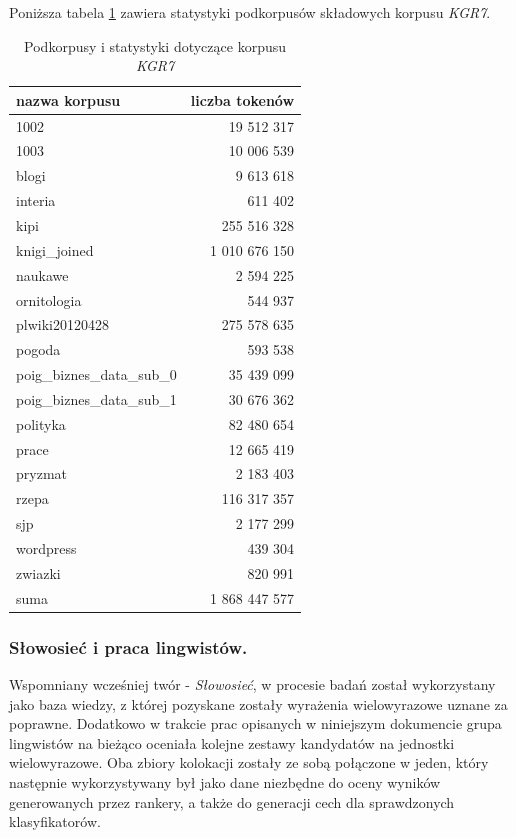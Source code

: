\documentclass[11pt,a4paper]{llncs}
\begin{document}
Poniższa tabela \ref{kgr7_stats} zawiera statystyki podkorpusów składowych korpusu \emph{KGR7}.
\begin{table}[h!]
\centering
\begin{tabular}{l | r}
	\toprule
	nazwa korpusu & liczba tokenów \\
	\midrule
	1002 & 19 512 317 \\
	1003 & 10 006 539 \\
	blogi & 9 613 618 \\
	interia & 611 402 \\
	kipi & 255 516 328 \\
	knigi\_joined & 1 010 676 150 \\
	naukawe & 2 594 225 \\
	ornitologia & 544 937 \\
	plwiki20120428 & 275 578 635 \\
	pogoda & 593 538 \\
	poig\_biznes\_data\_sub\_0 & 35 439 099 \\
	poig\_biznes\_data\_sub\_1 & 30 676 362 \\
	polityka & 82 480 654 \\
	prace & 12 665 419 \\
	pryzmat & 2 183 403 \\
	rzepa & 116 317 357 \\
	sjp & 2 177 299 \\
	wordpress & 439 304 \\
	zwiazki & 820 991 \\
	\hline
	suma & 1 868 447 577 \\
	\bottomrule
\end{tabular}
\caption[Podkorpusy i statystyki korpusu \emph{KGR7}]{Podkorpusy i statystyki dotyczące korpusu \emph{KGR7}}
\label{kgr7_stats}
\end{table}


\subsubsection{Słowosieć i praca lingwistów.}

Wspomniany wcześniej twór - \emph{Słowosieć}, w procesie badań został wykorzystany jako baza wiedzy, z której pozyskane zostały wyrażenia wielowyrazowe uznane za poprawne.
Dodatkowo w trakcie prac opisanych w niniejszym dokumencie grupa lingwistów na bieżąco oceniała kolejne zestawy kandydatów na jednostki wielowyrazowe.
Oba zbiory kolokacji zostały ze sobą połączone w jeden, który następnie wykorzystywany był jako dane niezbędne do oceny wyników generowanych przez rankery, a także do generacji cech dla sprawdzonych klasyfikatorów.
\end{document}
